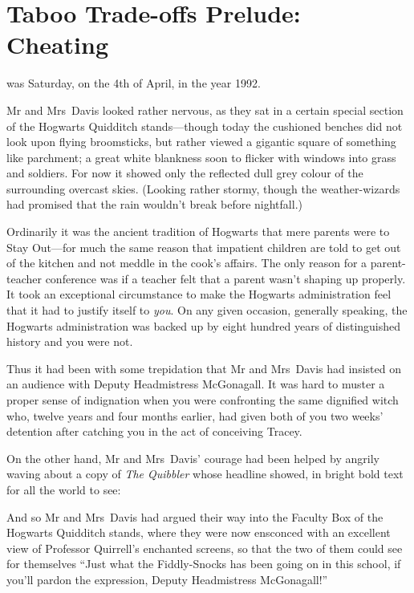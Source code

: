 \chapter{Taboo Trade-offs Prelude: Cheating}

 was Saturday, on the 4th of April, in the year 1992.

\hplettrineextrapara
Mr and Mrs~Davis looked rather nervous, as they sat in a certain special section of the Hogwarts Quidditch stands—though today the cushioned benches did not look upon flying broomsticks, but rather viewed a gigantic square of something like parchment; a great white blankness soon to flicker with windows into grass and soldiers. For now it showed only the reflected dull grey colour of the surrounding overcast skies. (Looking rather stormy, though the weather-wizards had promised that the rain wouldn’t break before nightfall.)

Ordinarily it was the ancient tradition of Hogwarts that mere parents were to Stay Out—for much the same reason that impatient children are told to get out of the kitchen and not meddle in the cook’s affairs. The only reason for a parent-teacher conference was if a teacher felt that a parent wasn’t shaping up properly. It took an exceptional circumstance to make the Hogwarts administration feel that it had to justify itself to \emph{you}. On any given occasion, generally speaking, the Hogwarts administration was backed up by eight hundred years of distinguished history and you were not.

Thus it had been with some trepidation that Mr and Mrs~Davis had insisted on an audience with Deputy Headmistress McGonagall. It was hard to muster a proper sense of indignation when you were confronting the same dignified witch who, twelve years and four months earlier, had given both of you two weeks’ detention after catching you in the act of conceiving Tracey.

On the other hand, Mr and Mrs~Davis’ courage had been helped by angrily waving about a copy of \emph{The Quibbler} whose headline showed, in bright bold text for all the world to see:


And so Mr and Mrs~Davis had argued their way into the Faculty Box of the Hogwarts Quidditch stands, where they were now ensconced with an excellent view of Professor Quirrell’s enchanted screens, so that the two of them could see for themselves “Just what the Fiddly-Snocks has been going on in this school, if you’ll pardon the expression, Deputy Headmistress McGonagall!”

